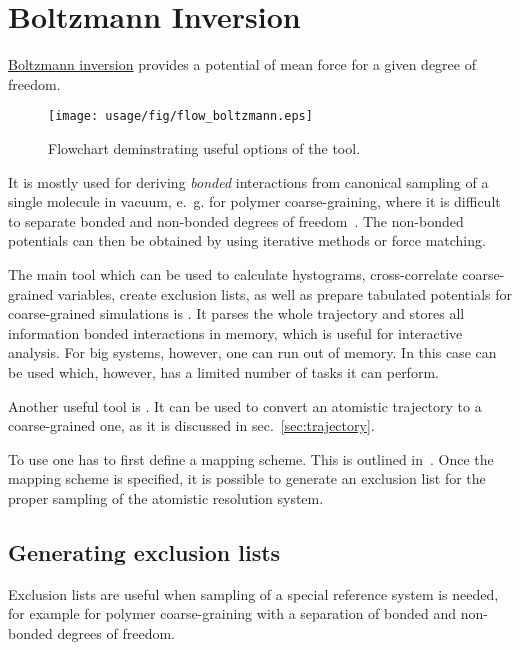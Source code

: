 \chapter{Boltzmann Inversion}

\hyperref[sec:bi]{Boltzmann inversion} provides a potential of mean force for a given degree of freedom. 
%
\begin{wrapfigure}{t}{7cm}
   \centering
   \texttt{[image: usage/fig/flow\_boltzmann.eps]}
   \caption{Flowchart deminstrating useful options of the tool.}
\end{wrapfigure}
%
It is mostly used for deriving {\em bonded} interactions from canonical sampling of a single molecule in vacuum, e.~g. for polymer coarse-graining, where it is difficult to separate bonded and non-bonded degrees of freedom~\cite{Tschoep:1998}. The non-bonded potentials can then be obtained by using iterative  methods or force matching.

The main tool which can be used to calculate hystograms, cross-correlate coarse-grained variables, create exclusion lists, as well as prepare tabulated potentials for coarse-grained simulations is .  It parses the whole trajectory and stores all information bonded interactions in memory, which is useful for interactive analysis. For big systems, however, one can run out of memory. In this case  can be used which, however, has a limited number of tasks it can perform.

Another useful tool is . It can be used to convert an atomistic trajectory to a coarse-grained one, as it is discussed in sec.~\ref{sec:trajectory}.

To use  one has to first define a mapping scheme. This is outlined in~. Once the mapping scheme is specified, it is possible to generate an exclusion list for the proper sampling of the atomistic resolution system. 

\section{Generating exclusion lists}
\label{sec:exclusions}
Exclusion lists are useful when sampling of a special reference system is needed, for example for polymer coarse-graining with a separation of bonded and non-bonded degrees of freedom.

